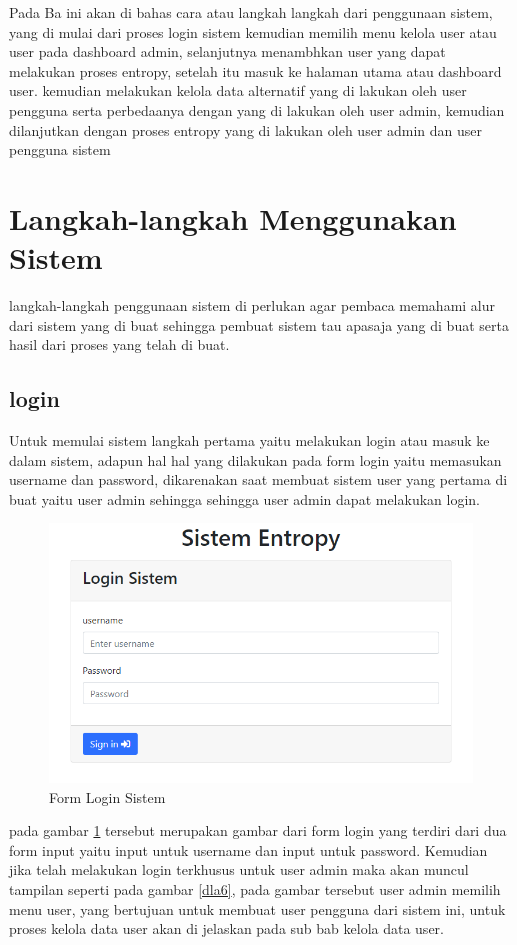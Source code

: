 
Pada Ba ini akan di bahas cara atau langkah langkah dari penggunaan sistem, yang di mulai dari proses login sistem kemudian memilih menu kelola user atau user pada dashboard admin, selanjutnya menambhkan user yang dapat melakukan proses entropy, setelah itu masuk ke halaman utama atau dashboard user. kemudian melakukan kelola data alternatif yang di lakukan oleh user pengguna serta perbedaanya dengan yang di lakukan oleh user admin, kemudian dilanjutkan dengan proses entropy yang di lakukan oleh user admin dan user pengguna sistem
\pagebreak

\section{Langkah-langkah Menggunakan Sistem}
	langkah-langkah penggunaan sistem di perlukan agar pembaca memahami alur dari sistem yang di buat sehingga pembuat sistem tau apasaja yang di buat serta hasil dari proses yang telah di buat.
\subsection{login}
	Untuk memulai sistem langkah pertama yaitu melakukan login atau masuk ke dalam sistem, adapun hal hal yang dilakukan pada form login yaitu memasukan username dan password, dikarenakan saat membuat sistem user yang pertama di buat yaitu user admin sehingga sehingga user admin dapat melakukan login.
\begin{figure}[!htbp]
	\centerline{\includegraphics[width=1\textwidth]{figures/view/7.png}}
	\caption{Form Login Sistem}
	\label{l61}
\end{figure}
pada gambar \ref{l61} tersebut merupakan gambar dari form login yang terdiri dari dua form input yaitu input untuk username dan input untuk password. Kemudian jika telah melakukan login terkhusus untuk user admin maka akan muncul tampilan seperti pada gambar \ref{dla6}, pada gambar tersebut user admin memilih menu user, yang bertujuan untuk membuat user pengguna dari sistem ini, untuk proses kelola data user akan di jelaskan pada sub bab kelola data user.
\pagebreak

